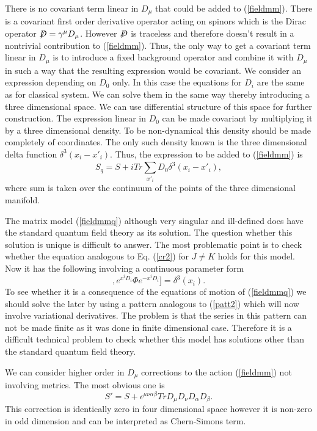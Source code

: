 \documentclass[a4paper,11pt]{article}
\begin{document}
There is no covariant term linear in $D_\mu$ that could be added
to (\ref{fieldmm}). There is a covariant first order derivative
operator acting on spinors which is the Dirac operator
$\mathord{\not\mathrel{D}}=\gamma^\mu D_\mu$. However
$\mathord{\not\mathrel{D}}$ is traceless and therefore doesn't
result in a nontrivial contribution to (\ref{fieldmm}). Thus, the
only way to get a covariant term linear in $D_\mu$ is to introduce
a fixed background operator and combine it with $D_\mu$ in such a
way that the resulting expression would be covariant. We consider
an expression depending on $D_0$ only. In this case the equations
for $D_i$ are the same as for classical system. We can solve them
in the same way thereby introducing a three dimensional space. We
can use differential structure of this space for further
construction.  The expression linear in $D_0$ can be made
covariant by multiplying it by a three dimensional density. To be
non-dynamical this density should be made completely of
coordinates. The only such density known is the three dimensional
delta function $\delta^3(x_i-x'_i)$. Thus, the expression to be
added to (\ref{fieldmm}) is
\begin{equation}
S_q=S+i Tr \sum\limits_{x'_i}^{} D_0 \delta^3 (x_i-x'_i),
\label{fieldmmq}
\end{equation}
where sum is taken over the continuum of the points of the three
dimensional manifold.

The matrix model (\ref{fieldmmq}) although very singular and
ill-defined does have the standard quantum field theory as its
solution. The question whether this solution is unique is
difficult to answer. The most problematic point is to check
whether the equation analogous to Eq. (\ref{cr2}) for $J\not=K$
holds for this model. Now it has the following involving a
continuous parameter form
\begin{equation}
[[D_0,\Phi],e^{x^iD_i}\Phi e^{-x^iD_i}]=\delta^3(x_i).
\label{cr2ft}
\end{equation}
To see whether it is a consequence of the equations of motion of
(\ref{fieldmmq}) we should solve the later by using a pattern
analogous to (\ref{patt2}) which will now involve variational
derivatives. The problem is that the series in this pattern can
not be made finite as it was done in finite dimensional case.
Therefore it is a difficult technical problem to check whether
this model has solutions other than the standard quantum field
theory.

We can consider higher order in $D_\mu$ corrections to the action
(\ref{fieldmm}) not involving metrics. The most obvious one is
\begin{equation}
S'=S+\epsilon^{\mu \nu \alpha \beta} Tr D_\mu D_\nu D_\alpha
D_\beta. \label{cst}
\end{equation}
This correction is identically zero in four dimensional space
however it is non-zero in odd dimension and can be interpreted as
Chern-Simons term.
\end{document}
